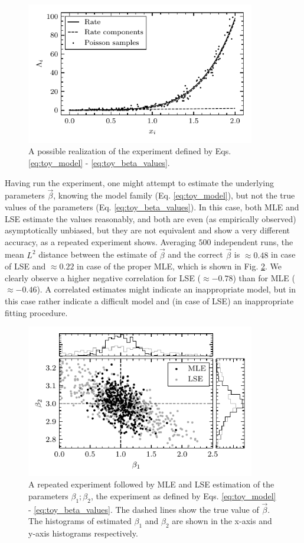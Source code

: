 \begin{figure}[h]
 	\centering
 	\includegraphics[width=10cm]{figures/toy_model_curve.pdf}
 	\caption{A possible realization of the experiment defined by Eqs. \ref{eq:toy_model} - \ref{eq:toy_beta_values}.}
 	\label{fig:toy_model_curve}
\end{figure}

Having run the experiment, one might attempt to estimate the underlying parameters $\vec{\beta}$, knowing the model family (Eq. \ref{eq:toy_model}), but not the true values of the parameters (Eq. \ref{eq:toy_beta_values}). In this case, both MLE and LSE estimate the values reasonably, and both are even (as empirically observed) asymptotically unbiased, but they are not equivalent and show a very different accuracy, as a repeated experiment shows. Averaging $500$ independent runs, the mean $L^2$ distance between the estimate of $\vec{\beta}$ and the correct $\vec{\beta}$ is $\approx 0.48$ in case of LSE and $\approx 0.22$ in case of the proper MLE, which is shown in Fig. \ref{fig:toy_model_draws}. We clearly observe a higher negative correlation for LSE ($\approx -0.78 $) than for MLE ($\approx -0.46 $). A correlated estimates might indicate an inappropriate model, but in this case rather indicate a difficult model and (in case of LSE) an inappropriate fitting procedure.

\begin{figure}[h]
 	\centering
 	\includegraphics[width=10cm]{figures/toy_model_draws.pdf}
 	\caption{A repeated experiment followed by MLE and LSE estimation of the parameters $\beta_1; \beta_2$, the experiment as defined by Eqs. \ref{eq:toy_model} - \ref{eq:toy_beta_values}. The dashed lines show the true value of $\vec{\beta}$. The histograms of estimated $\beta_1$ and $\beta_2$ are shown in the x-axis and y-axis histograms respectively.}
 	\label{fig:toy_model_draws}
\end{figure}


